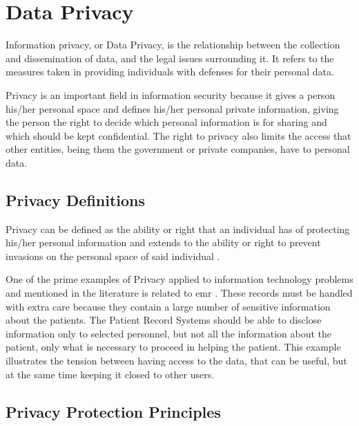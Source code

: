 \section{Data Privacy} 
\label{sec:DataPrivacy}

Information privacy, or Data Privacy, is the relationship between the collection and dissemination of data, and the legal issues surrounding it. It refers to the measures taken in providing individuals with defenses for their personal data.

Privacy is an important field in information security because it gives a person his/her personal space and defines his/her personal private information, giving the person the right to decide which personal information is for sharing and which should be kept confidential. The right to privacy also limits the access that other entities, being them the government or private companies, have to personal data.


\subsection{Privacy Definitions}
\label{ssec:PrivacyDefinitions}


Privacy can be defined as the ability or right that an individual has of protecting his/her personal information and extends to the ability or right to prevent invasions on the personal space of said individual \cite{anderson2008security}.

One of the prime examples of Privacy applied to information technology problems and mentioned in the literature is related to \ac{emr} \cite{Lu2014}. These records must be handled with extra care because they contain a large number of sensitive information about the patients. The Patient Record Systems should be able to disclose information only to selected personnel, but not all the information about the patient, only what is necessary to proceed in helping the patient. This example illustrates the tension between having access to the data, that can be useful, but at the same time keeping it closed to other users.



\subsection{Privacy Protection Principles}
\label{ssec:PrivacyProtectionGoals}

